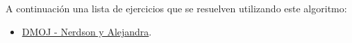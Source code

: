 A continuación una lista de ejercicios que se resuelven utilizando este algoritmo:

\begin{itemize}
	\item \href{https://dmoj.uclv.edu.cu/problem/nerdsonalejandra} {DMOJ - Nerdson y Alejandra}.

\end{itemize}
